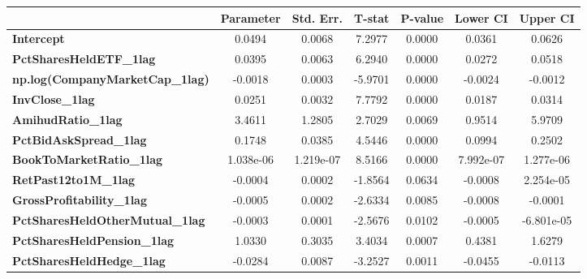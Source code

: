 \begin{center}
\begin{tabular}{lclc}
\bottomrule
\end{tabular}
\begin{tabular}{lcccccc}
                                        & \textbf{Parameter} & \textbf{Std. Err.} & \textbf{T-stat} & \textbf{P-value} & \textbf{Lower CI} & \textbf{Upper CI}  \\
\midrule
\textbf{Intercept}                      &       0.0494       &       0.0068       &      7.2977     &      0.0000      &       0.0361      &       0.0626       \\
\textbf{PctSharesHeldETF\_1lag}         &       0.0395       &       0.0063       &      6.2940     &      0.0000      &       0.0272      &       0.0518       \\
\textbf{np.log(CompanyMarketCap\_1lag)} &      -0.0018       &       0.0003       &     -5.9701     &      0.0000      &      -0.0024      &      -0.0012       \\
\textbf{InvClose\_1lag}                 &       0.0251       &       0.0032       &      7.7792     &      0.0000      &       0.0187      &       0.0314       \\
\textbf{AmihudRatio\_1lag}              &       3.4611       &       1.2805       &      2.7029     &      0.0069      &       0.9514      &       5.9709       \\
\textbf{PctBidAskSpread\_1lag}          &       0.1748       &       0.0385       &      4.5446     &      0.0000      &       0.0994      &       0.2502       \\
\textbf{BookToMarketRatio\_1lag}        &     1.038e-06      &     1.219e-07      &      8.5166     &      0.0000      &     7.992e-07     &     1.277e-06      \\
\textbf{RetPast12to1M\_1lag}            &      -0.0004       &       0.0002       &     -1.8564     &      0.0634      &      -0.0008      &     2.254e-05      \\
\textbf{GrossProfitability\_1lag}       &      -0.0005       &       0.0002       &     -2.6334     &      0.0085      &      -0.0008      &      -0.0001       \\
\textbf{PctSharesHeldOtherMutual\_1lag} &      -0.0003       &       0.0001       &     -2.5676     &      0.0102      &      -0.0005      &     -6.801e-05     \\
\textbf{PctSharesHeldPension\_1lag}     &       1.0330       &       0.3035       &      3.4034     &      0.0007      &       0.4381      &       1.6279       \\
\textbf{PctSharesHeldHedge\_1lag}       &      -0.0284       &       0.0087       &     -3.2527     &      0.0011      &      -0.0455      &      -0.0113       \\

\end{tabular}
\end{center}
